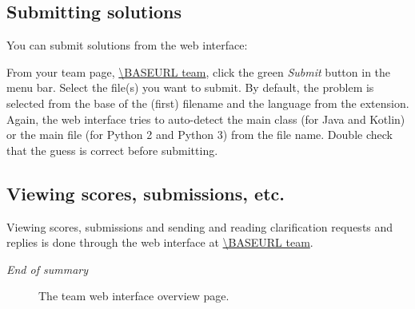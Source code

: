 \subsection*{Submitting solutions}

You can submit solutions%
from the web interface:
\begin{description}[\breaklabel\setlabelstyle{\bfseries}]
\item[Web interface]
From your team page, \url{\BASEURL team}, click the green \emph{Submit} button
in the menu bar. Select the file(s) you want to submit.
By default, the problem is selected from the base of the (first)
filename and the language from the extension. Again, the web interface tries
to auto-detect the main class (for Java and Kotlin) or the main file (for
Python 2 and Python 3) from the file name. Double check that the guess is
correct before submitting.
\end{description}

\subsection*{Viewing scores, submissions, etc.}

Viewing scores, submissions and sending and reading clarification
requests and replies is done through the web interface at
\url{\BASEURL team}.

\emph{End of summary}

\begin{figure}[p]
  \centering
  \caption{The team web interface overview page.}
  \label{fig:team-overview}
\end{figure}

